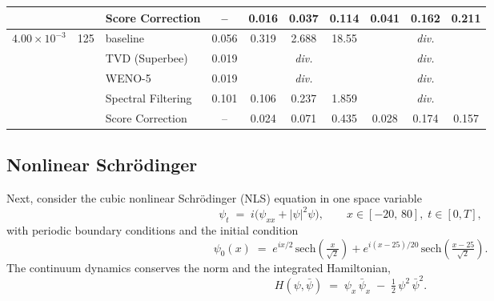 \documentclass[letterpaper]{article} %
\begin{document}
\begin{table}[t]
\begin{tabular}{c c l | c | c c c | c c c}
 & & Score Correction & -- & 0.016 & 0.037 & 0.114 & 0.041 & 0.162 & 0.211 \\
 \hline
\multirow{5}{*}{$4.00\!\times\!10^{-3}$} & \multirow{5}{*}{125}
 & baseline & 0.056 & 0.319 & 2.688 & 18.55 & \multicolumn{3}{c}{\textit{div.}} \\
 & & TVD (Superbee) & 0.019 & \multicolumn{3}{c|}{\textit{div.}} & \multicolumn{3}{c}{\textit{div.}} \\
 & & WENO-5 & 0.019 & \multicolumn{3}{c|}{\textit{div.}} & \multicolumn{3}{c}{\textit{div.}} \\
 & & Spectral Filtering & 0.101 & 0.106 & 0.237 & 1.859 & \multicolumn{3}{c}{\textit{div.}} \\
 & & Score Correction & -- & 0.024 & 0.071 & 0.435 & 0.028 & 0.174 & 0.157 \\
\hline
    \end{tabular}
\end{table}





\subsection{Nonlinear Schr\"odinger}\label{sec:nls}

Next, consider the cubic nonlinear Schr\"odinger (NLS)
equation in one space variable
\begin{equation}\label{eq:nls}
    \psi_t \;=\; i\bigl(\psi_{xx} + |\psi|^2 \psi\bigr),
    \qquad x \in [-20,\,80],\; t \in [0, T],
\end{equation}
with periodic boundary conditions and the
initial condition
\begin{equation}\label{eq:nls_ic}
    \psi_0(x) \;=\; e^{ix/2}\,\mathrm{sech}\!\left(\tfrac{x}{\sqrt 2}\right)
                  + e^{i(x-25)/20}\,\mathrm{sech}\!\left(\tfrac{x-25}{\sqrt 2}\right).
\end{equation}
The continuum dynamics conserves the norm
and the integrated Hamiltonian,
\begin{equation}\label{eq:nls_invariants}
    H(\psi, \bar\psi) \;=\; \psi_x\,\bar\psi_x \;-\; \tfrac{1}{2}\,\psi^2\,\bar\psi^2.
\end{equation}
\end{document}
